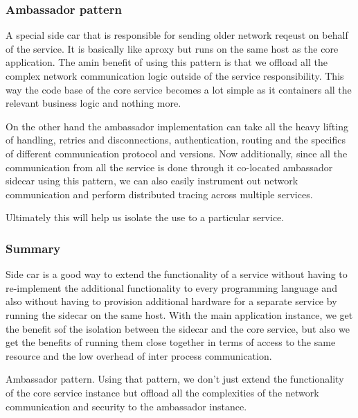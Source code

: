 \subsubsection{Ambassador pattern}
A special side car that is responsible for sending older network reqeust on behalf of the service.
It is basically like aproxy but runs on the same host as the core application.
The amin benefit of using this pattern is that we offload all the complex network communication logic outside of the service responsibility.
This way the code base of the core service becomes a lot simple as it containers all the relevant business logic and nothing more.

On the other hand the ambassador implementation can take all the heavy lifting of handling, retries and disconnections, authentication, routing and the specifics of different communication protocol and versions.
Now additionally, since all the communication from all the service is done through it co-located ambassador sidecar using this pattern, we can also easily instrument out network communication and perform distributed tracing across multiple services.

Ultimately this will help us isolate the use to a particular service.

\subsubsection{Summary}
Side car is a good way to extend the functionality of a service without having to re-implement the additional functionality to every programming language and also without having to provision additional hardware for a separate service by running the sidecar on the same host.
With the main application instance, we get the benefit sof the isolation between the sidecar and the core service, but also we get the benefits of running them close together in terms of access to the same resource and the low overhead of inter process communication.

Ambassador pattern.
Using that pattern, we don't just extend the functionality of the core service instance but offload all the complexities of the network communication and security to the ambassador instance.


